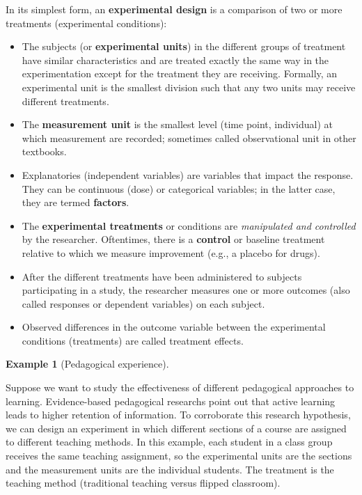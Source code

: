 \documentclass[
  11pt,
  letterpaper,
]{scrbook}
\providecommand{\tightlist}{%
  \setlength{\itemsep}{0pt}\setlength{\parskip}{0pt}}\usepackage{longtable,booktabs,array}
\theoremstyle{definition}
\theoremstyle{definition}
\newtheorem{example}{Example}[chapter]
\theoremstyle{remark}
\begin{document}
In its simplest form, an \textbf{experimental design} is a comparison of
two or more treatments (experimental conditions):

\begin{itemize}
\tightlist
\item
  The subjects (or \textbf{experimental units}) in the different groups
  of treatment have similar characteristics and are treated exactly the
  same way in the experimentation except for the treatment they are
  receiving. Formally, an experimental unit is the smallest division
  such that any two units may receive different treatments.
\item
  The \textbf{measurement unit} is the smallest level (time point,
  individual) at which measurement are recorded; sometimes called
  observational unit in other textbooks.
\item
  Explanatories (independent variables) are variables that impact the
  response. They can be continuous (dose) or categorical variables; in
  the latter case, they are termed \textbf{factors}.
\item
  The \textbf{experimental treatments} or conditions are
  \emph{manipulated and controlled} by the researcher. Oftentimes, there
  is a \textbf{control} or baseline treatment relative to which we
  measure improvement (e.g., a placebo for drugs).
\item
  After the different treatments have been administered to subjects
  participating in a study, the researcher measures one or more outcomes
  (also called responses or dependent variables) on each subject.
\item
  Observed differences in the outcome variable between the experimental
  conditions (treatments) are called treatment effects.
\end{itemize}

\begin{example}[Pedagogical
experience]\protect\hypertarget{exm-experimentdefinitions}{}\label{exm-experimentdefinitions}

Suppose we want to study the effectiveness of different pedagogical
approaches to learning. Evidence-based pedagogical researchs point out
that active learning leads to higher retention of information. To
corroborate this research hypothesis, we can design an experiment in
which different sections of a course are assigned to different teaching
methods. In this example, each student in a class group receives the
same teaching assignment, so the experimental units are the sections and
the measurement units are the individual students. The treatment is the
teaching method (traditional teaching versus flipped classroom).

\end{example}
\end{document}
